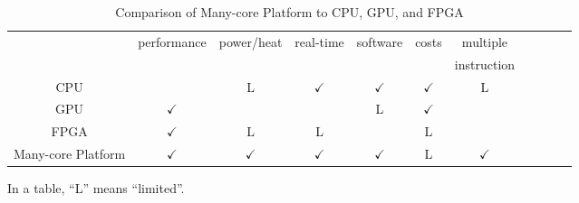 \begin{landscape}
  \begin{table}[thbp]
    \caption{\label{tb:comparison_platforms}
      Comparison of Many-core Platform to CPU, GPU, and FPGA}
    \centering
    \begin{tabular}{c|cccccccccc}
      \hline
      & \multirow{2}{*}{performance} & \multirow{2}{*}{power/heat} & \multirow{2}{*}{real-time} & software & \multirow{2}{*}{costs} & multiple\\
      &&&&& development & instruction \\
      \hline
      \hline
      CPU & & L & \(\checkmark\) & \(\checkmark\) & \(\checkmark\) & L \\
      GPU & \(\checkmark\) &  &  & L & \(\checkmark\)\\
      FPGA & \(\checkmark\) & L & L &  & L & \\
      Many-core Platform & \(\checkmark\) & \(\checkmark\) & \(\checkmark\) & \(\checkmark\) & L & \(\checkmark\) \\
      \hline
    \end{tabular}
    \begin{flushright}
         \textasteriskcentered In a table, ``L'' means ``limited''.
    \end{flushright}
  \end{table}


\end{landscape}
